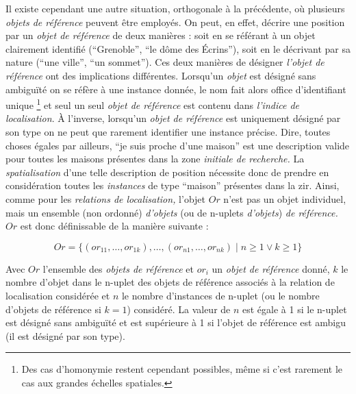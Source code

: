 Il existe cependant une autre situation, orthogonale à la précédente,
où plusieurs \emph{objets de référence} peuvent être employés. On
peut, en effet, décrire une position par un \emph{objet de référence}
de deux manières : soit en se référant à un objet clairement identifié
(\eg \enquote{Grenoble}, \enquote{le dôme des Écrins}), soit en le
décrivant par sa nature (\eg \enquote{une ville}, \enquote{un
  sommet}). Ces deux manières de désigner \emph{l'objet de référence}
ont des implications différentes. Lorsqu'un \emph{objet} est désigné
sans ambiguïté on se réfère à une instance donnée, le nom fait alors
office d'identifiant unique \footnote{Des cas d’homonymie restent
  cependant possibles, même si c'est rarement le cas aux grandes
  échelles spatiales.} et seul un seul \emph{objet de référence} est
contenu dans \emph{l'indice de localisation}. À l'inverse, lorsqu'un
\emph{objet de référence} est uniquement désigné par son type on ne
peut que rarement identifier une instance précise. Dire, toutes choses
égales par ailleurs, \enquote{je suis proche d'une maison} est une
description valide pour toutes les maisons présentes dans la zone
\emph{initiale de recherche.} La \emph{spatialisation} d'une telle
description de position nécessite donc de prendre en considération
toutes les \emph{instances} de type \enquote{maison} présentes dans la
\ac{zir}. Ainsi, comme pour les \emph{relations de localisation,}
l'objet \(Or\) n'est pas un objet individuel, mais un ensemble (non
ordonné) \emph{d'objets} (ou de n-uplets \emph{d'objets}) \emph{de
  référence.} \(Or\) est donc définissable de la manière suivante :

\begin{equation}
  Or = \{(or_{11}, \ldots,  or_{1k}), \ldots, (or_{n1}, \ldots,
  or_{nk}) \mid  n ≥ 1 \vee k ≥ 1\}
\end{equation}

Avec \(Or\) l'ensemble des \emph{objets de référence} et \(or_i\) un
\emph{objet de référence} donné, \(k\) le nombre d'objet dans le
n-uplet des objets de référence associés à la relation de localisation
considérée et \(n\) le nombre d'instances de n-uplet (ou le nombre
d'objets de référence si $k=1$) considéré. La valeur de \(n\) est
égale à 1 si le n-uplet est désigné sans ambiguïté et est supérieure à
1 si l'objet de référence est ambigu (\eg il est désigné par son
type).


